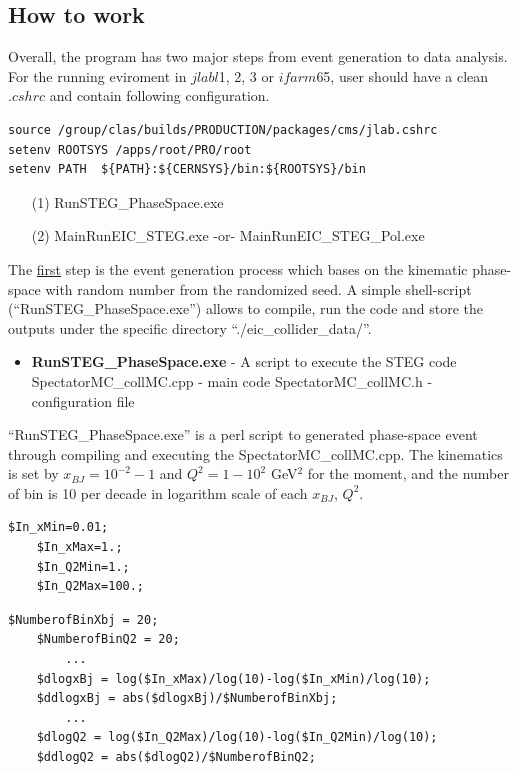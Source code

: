\documentclass[12pt,letterpaper]{article}
\begin{document}
\subsection{How to work}
Overall, the program has two major steps from event generation to data analysis. 
For the running eviroment in $jlabl$1, 2, 3 or $ifarm$65, user should have a clean $.cshrc$ and contain following configuration.
\fontsize{9}{9}
\begin{Verbatim}[frame=single]
source /group/clas/builds/PRODUCTION/packages/cms/jlab.cshrc
setenv ROOTSYS /apps/root/PRO/root
setenv PATH  ${PATH}:${CERNSYS}/bin:${ROOTSYS}/bin
\end{Verbatim}


\begin{itemize}
\item[(1)] RunSTEG\_PhaseSpace.exe
\item[(2)] MainRunEIC\_STEG.exe  -or- MainRunEIC\_STEG\_Pol.exe
\end{itemize}


The \underline{first} step is the event generation process which bases on the kinematic phase-space with random number from the randomized seed. A simple shell-script (``RunSTEG\_PhaseSpace.exe'') allows to compile, run the code and store the outputs under the specific directory ``./eic\_collider\_data/''.\\
\begin{itemize}
\item{} \textbf{RunSTEG\_PhaseSpace.exe} - A script to execute the STEG code
 SpectatorMC\_collMC.cpp - main code
 SpectatorMC\_collMC.h  - configuration file
\end{itemize}

``RunSTEG\_PhaseSpace.exe'' is a perl script to generated phase-space event through compiling and executing the SpectatorMC\_collMC.cpp. The kinematics is set by $x_{BJ}=10^{-2}-1$ and $Q^2=1-10^2$ GeV$^2$ for the moment, and the number of bin is 10 per decade in logarithm scale of each $x_{BJ}$, $Q^2$. 
\fontsize{9}{9}
\begin{Verbatim}[frame=single]
	$In_xMin=0.01;
	$In_xMax=1.;
	$In_Q2Min=1.;
	$In_Q2Max=100.;
\end{Verbatim}

\fontsize{9}{9}
\begin{Verbatim}[frame=single]
	$NumberofBinXbj = 20;
	$NumberofBinQ2 = 20;
        ...
	$dlogxBj = log($In_xMax)/log(10)-log($In_xMin)/log(10);
	$ddlogxBj = abs($dlogxBj)/$NumberofBinXbj;
        ...
	$dlogQ2 = log($In_Q2Max)/log(10)-log($In_Q2Min)/log(10);
	$ddlogQ2 = abs($dlogQ2)/$NumberofBinQ2;
\end{Verbatim}
\end{document}
